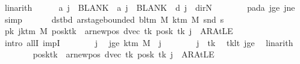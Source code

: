 \begin{isabellebody}
\ linarith\isanewline
\ \ \ \ \isamarkupfalse%
\ {\isachardoublequoteopen}{\isacharquery}{\kern0pt}a\ j\ {\isacharequal}{\kern0pt}\ BLANK{}\ {\isasymand}\ {\isacharquery}{\kern0pt}a\ j\ {\isacharequal}{\kern0pt}\ BLANK{}\ {\isasymand}\ {\isacharquery}{\kern0pt}d\ j\ {\isacharequal}{\kern0pt}\ dir{\isachardot}{\kern0pt}N{\isachardoublequoteclose}\isanewline
\ \ \ \ \ \ \isamarkupfalse%
\ pad{\isacharunderscore}{\kern0pt}a\ jge\ jne\ \isamarkupfalse%
\ simp\isanewline
\ \ \isamarkupfalse%
\isanewline
\ \ \isamarkupfalse%
\ dst{\isacharunderscore}{\kern0pt}bd{\isacharcolon}{\kern0pt}\ {\isachardoublequoteopen}ar{\isacharunderscore}{\kern0pt}stage{\isacharunderscore}{\kern0pt}bounded\ {\isacharparenleft}{\kern0pt}bl{\isacharunderscore}{\kern0pt}tm\ M{\isacharparenright}{\kern0pt}\ {\isacharparenleft}{\kern0pt}k{\isacharunderscore}{\kern0pt}tm\ M{\isacharparenright}{\kern0pt}\ {\isacharparenleft}{\kern0pt}snd\ {\isacharquery}{\kern0pt}s{\isacharprime}{\kern0pt}{\isacharparenright}{\kern0pt}{\isachardoublequoteclose}\isanewline
\ \ \isamarkupfalse%
\ {\isacharminus}{\kern0pt}\isanewline
\ \ \ \ \isamarkupfalse%
\ pk{\isacharcolon}{\kern0pt}\ {\isachardoublequoteopen}{\isasymforall}j{\isasymge}k{\isacharunderscore}{\kern0pt}tm\ M{\isachardot}{\kern0pt}\ {\isacharparenleft}{\kern0pt}posk{\isacharparenleft}{\kern0pt}tk\ {\isacharcolon}{\kern0pt}{\isacharequal}{\kern0pt}\ ar{\isacharunderscore}{\kern0pt}newpos\ {\isacharparenleft}{\kern0pt}dvec\ tk{\isacharparenright}{\kern0pt}\ {\isacharparenleft}{\kern0pt}posk\ tk{\isacharparenright}{\kern0pt}{\isacharparenright}{\kern0pt}{\isacharparenright}{\kern0pt}\ j\ {\isacharequal}{\kern0pt}\ AR{\isacharunderscore}{\kern0pt}AtLE{\isachardoublequoteclose}\isanewline
\ \ \ \ \isamarkupfalse%
\ {\isacharparenleft}{\kern0pt}intro\ allI\ impI{\isacharparenright}{\kern0pt}\isanewline
\ \ \ \ \ \ \isamarkupfalse%
\ j\ \isamarkupfalse%
\ jge{\isacharcolon}{\kern0pt}\ {\isachardoublequoteopen}k{\isacharunderscore}{\kern0pt}tm\ M\ {\isasymle}\ j{\isachardoublequoteclose}\isanewline
\ \ \ \ \ \ \isamarkupfalse%
\ {\isachardoublequoteopen}j\ {\isasymnoteq}\ tk{\isachardoublequoteclose}\ \isamarkupfalse%
\ tk{\isacharunderscore}{\kern0pt}lt\ jge\ \isamarkupfalse%
\ linarith\isanewline
\ \ \ \ \ \ \isamarkupfalse%
\ {\isachardoublequoteopen}{\isacharparenleft}{\kern0pt}posk{\isacharparenleft}{\kern0pt}tk\ {\isacharcolon}{\kern0pt}{\isacharequal}{\kern0pt}\ ar{\isacharunderscore}{\kern0pt}newpos\ {\isacharparenleft}{\kern0pt}dvec\ tk{\isacharparenright}{\kern0pt}\ {\isacharparenleft}{\kern0pt}posk\ tk{\isacharparenright}{\kern0pt}{\isacharparenright}{\kern0pt}{\isacharparenright}{\kern0pt}\ j\ {\isacharequal}{\kern0pt}\ AR{\isacharunderscore}{\kern0pt}AtLE{\isachardoublequoteclose}\isanewline

\end{isabellebody}
